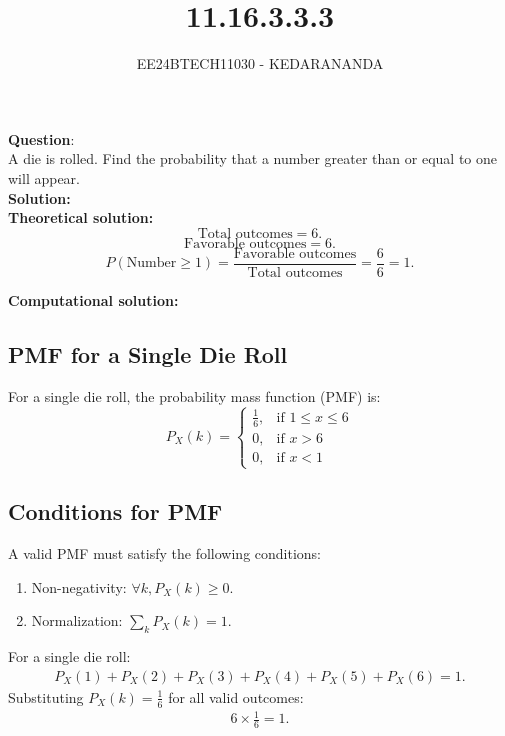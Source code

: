 \documentclass[journal]{IEEEtran}
\begin{document}
	
	
	\vspace{3cm}
	
	\title{11.16.3.3.3}
	\author{EE24BTECH11030 - KEDARANANDA }
	{\let\newpage\relax\maketitle}
	
	\renewcommand{\thefigure}{\theenumi}
	\renewcommand{\thetable}{\theenumi}
	\setlength{\intextsep}{10pt} %
	
	
	\renewcommand{\thetable}{\theenumi}
	
	
	\textbf{Question}:\\
	A die is rolled. Find the probability that a number greater than or equal to one will appear.\\
	\textbf{Solution: }\\
	\textbf{Theoretical solution: }\\
	\[
	\text{Total outcomes} = 6.
	\]
	\[
	\text{Favorable outcomes} = 6.
	\]
	\[
	P(\text{Number} \geq 1) = \frac{\text{Favorable outcomes}}{\text{Total outcomes}} = \frac{6}{6} = 1.
	\]
	
	\textbf{Computational solution: }\\
	\subsection*{PMF for a Single Die Roll}
	For a single die roll, the probability mass function (PMF) is:
	\[
	P_X(k) =
	\begin{cases}
		\frac{1}{6}, & \text{if } 1 \leq x \leq 6\\
		0, & \text{if } x > 6\\
		0, & \text{if } x < 1
	\end{cases}
	\]
	
	\subsection*{Conditions for PMF}
	A valid PMF must satisfy the following conditions:
	\begin{enumerate}
		\item Non-negativity: \(\forall k, P_X(k) \geq 0\).
		\item Normalization: \(\sum_{k} P_X(k) = 1\).
	\end{enumerate}
	For a single die roll:
	\begin{align}
		P_X(1) + P_X(2) + P_X(3) + P_X(4) + P_X(5) + P_X(6) = 1.
	\end{align}
	Substituting \(P_X(k) = \frac{1}{6}\) for all valid outcomes:
	\begin{align}
		6 \times \frac{1}{6} = 1.
	\end{align}
\end{document}
